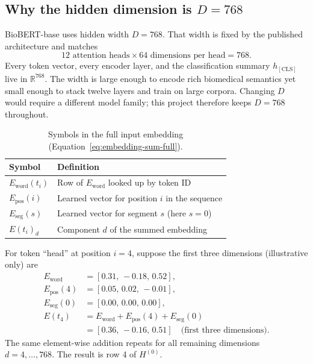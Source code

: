\subsection{Why the hidden dimension is \(D = 768\)}

BioBERT-base uses hidden width \(D = 768\). That width is fixed by the published architecture \citep{lee2020biobert,devlin2019bert} and matches
\begin{equation}
  12 \text{ attention heads} \times 64 \text{ dimensions per head} = 768.
\end{equation}
Every token vector, every encoder layer, and the classification summary \(h_{\mathrm{[CLS]}}\) live in \(\mathbb{R}^{768}\). The width is large enough to encode rich biomedical semantics yet small enough to stack twelve layers and train on large corpora. Changing \(D\) would require a different model family; this project therefore keeps \(D=768\) throughout.

\begin{table}[H]
\centering
\small
\begin{tabular}{|l|p{10cm}|}
\hline
\textbf{Symbol} & \textbf{Definition} \\
\hline
\(E_{\mathrm{word}}(t_i)\) & Row of \(E_{\mathrm{word}}\) looked up by token ID \\
\(E_{\mathrm{pos}}(i)\) & Learned vector for position \(i\) in the sequence \\
\(E_{\mathrm{seg}}(s)\) & Learned vector for segment \(s\) (here \(s=0\)) \\
\(E(t_i)_d\) & Component \(d\) of the summed embedding \\
\hline
\end{tabular}
\caption{Symbols in the full input embedding (Equation~\eqref{eq:embedding-sum-full}).}
\label{tab:embed-full-symbols}
\end{table}

\begin{example}
For token ``head'' at position \(i=4\), suppose the first three dimensions (illustrative only) are
\begin{align*}
  E_{\mathrm{word}} &= [0.31,\,-0.18,\,0.52], \\
  E_{\mathrm{pos}}(4) &= [0.05,\,0.02,\,-0.01], \\
  E_{\mathrm{seg}}(0) &= [0.00,\,0.00,\,0.00], \\
  E(t_4) &= E_{\mathrm{word}} + E_{\mathrm{pos}}(4) + E_{\mathrm{seg}}(0) \\
         &= [0.36,\,-0.16,\,0.51] \quad \text{(first three dimensions)}.
\end{align*}
The same element-wise addition repeats for all remaining dimensions \(d=4,\ldots,768\). The result is row 4 of \(H^{(0)}\).
\end{example}

